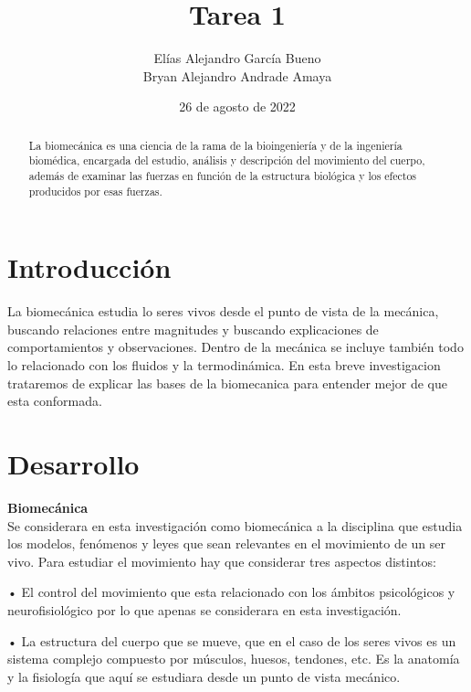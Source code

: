 \documentclass{article}
\author{Elías Alejandro García Bueno \\
Bryan Alejandro Andrade Amaya} %
\title{Tarea 1} %
\date{26 de agosto de 2022}
\begin{document}

\maketitle %

\begin{abstract} %
La biomecánica es una ciencia de la rama de la bioingeniería y de la ingeniería biomédica, encargada del estudio, análisis y descripción del movimiento del cuerpo, además de examinar las fuerzas en función de la estructura biológica y los efectos producidos por esas fuerzas. 
\end{abstract}

\section{Introducción}\label{intro} %

La biomecánica estudia lo seres vivos desde el punto de vista de la mecánica, buscando relaciones entre magnitudes y buscando explicaciones de comportamientos y observaciones. Dentro de la mecánica se incluye también todo lo relacionado con  los fluidos y la termodinámica.
En esta breve investigacion trataremos de explicar las bases de la biomecanica para entender mejor de que esta conformada.




\section{Desarrollo}
\cite{aguilar2000biomecanica}\textbf{Biomecánica} \\

Se considerara en esta investigación como biomecánica a la disciplina que estudia los modelos, fenómenos y leyes que sean relevantes en el movimiento de un ser vivo. Para estudiar el movimiento hay que considerar tres aspectos distintos:

•	El control del movimiento que esta relacionado con los ámbitos psicológicos y neurofisiológico por lo que apenas se considerara en esta investigación.

•	La estructura del cuerpo que se mueve, que en el caso de los seres vivos es un sistema complejo compuesto por músculos, huesos, tendones, etc. Es la anatomía y la fisiología que aquí se estudiara desde un punto de vista mecánico.
\end{document}
